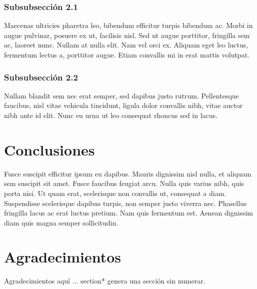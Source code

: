 \documentclass[12pt, twocolumn]{article}
\begin{document}
\subsubsection{Subsubsección 2.1}
Maecenas ultricies pharetra leo, bibendum efficitur turpis bibendum ac. Morbi in augue pulvinar, posuere ex ut, facilisis nisl. Sed ut augue porttitor, fringilla sem ac, laoreet nunc. Nullam at nulla elit. Nam vel orci ex. Aliquam eget leo luctus, fermentum lectus a, porttitor augue. Etiam convallis mi in erat mattis volutpat. 

\subsubsection{Subsubsección 2.2}
Nullam blandit sem nec erat semper, sed dapibus justo rutrum. Pellentesque faucibus, nisl vitae vehicula tincidunt, ligula dolor convallis nibh, vitae auctor nibh ante id elit. Nunc eu urna ut leo consequat rhoncus sed in lacus. 

\section{Conclusiones}
Fusce suscipit efficitur ipsum eu dapibus. Mauris dignissim nisl nulla, et aliquam sem suscipit sit amet. Fusce faucibus feugiat arcu. Nulla quis varius nibh, quis porta nisi. Ut quam erat, scelerisque non convallis ut, consequat a diam. Suspendisse scelerisque dapibus turpis, non semper justo viverra nec. Phasellus fringilla lacus ac erat luctus pretium. Nam quis fermentum est. Aenean dignissim diam quis magna semper sollicitudin. 


\section*{Agradecimientos}
Agradecimientos aquí ... section* genera una sección sin numerar.
\end{document}
